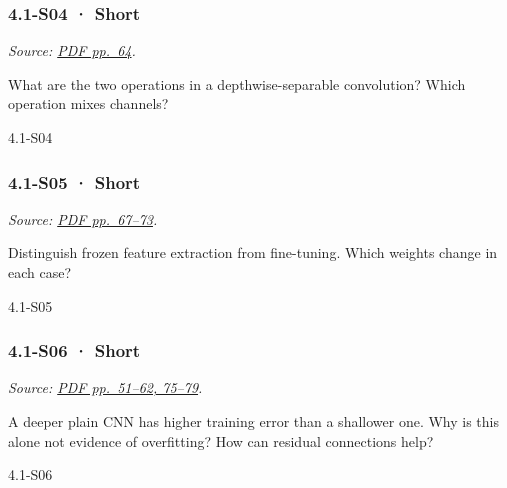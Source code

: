 \noindent\begin{minipage}{\linewidth}

\subsubsection{4.1-S04 · Short}\label{s04-short-11}

\emph{Source: \href{../Lecture\%20Slides/4.1.\%20CNNs.pdf\#page=64}{PDF
pp.~64}.}

What are the two operations in a depthwise-separable convolution? Which
operation mixes channels?

\begin{solution}[20mm]{4.1-S04}

\end{solution}
\end{minipage}\par\medskip

\noindent\begin{minipage}{\linewidth}

\subsubsection{4.1-S05 · Short}\label{s05-short-11}

\emph{Source: \href{../Lecture\%20Slides/4.1.\%20CNNs.pdf\#page=67}{PDF
pp.~67--73}.}

Distinguish frozen feature extraction from fine-tuning. Which weights
change in each case?

\begin{solution}[20mm]{4.1-S05}

\end{solution}
\end{minipage}\par\medskip

\noindent\begin{minipage}{\linewidth}

\subsubsection{4.1-S06 · Short}\label{s06-short-11}

\emph{Source: \href{../Lecture\%20Slides/4.1.\%20CNNs.pdf\#page=51}{PDF
pp.~51--62, 75--79}.}

A deeper plain CNN has higher training error than a shallower one. Why
is this alone not evidence of overfitting? How can residual connections
help?

\begin{solution}[20mm]{4.1-S06}

\end{solution}
\end{minipage}\par\medskip

